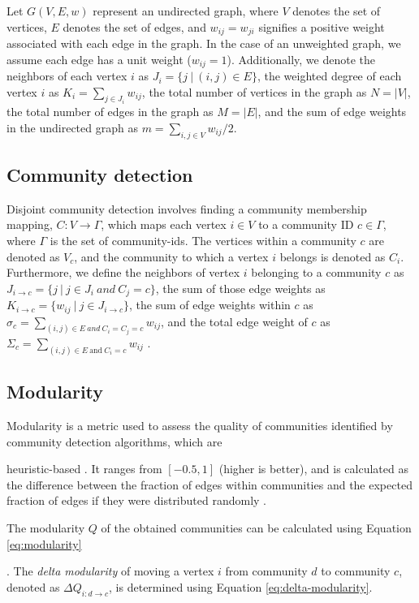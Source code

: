 Let $G(V, E, w)$ represent an undirected graph, where $V$ denotes the set of vertices, $E$ denotes the set of edges, and $w_{ij} = w_{ji}$ signifies a positive weight associated with each edge in the graph. In the case of an unweighted graph, we assume each edge has a unit weight ($w_{ij} = 1$). Additionally, we denote the neighbors of each vertex $i$ as $J_i = \{j\ |\ (i, j) \in E\}$, the weighted degree of each vertex $i$ as $K_i = \sum_{j \in J_i} w_{ij}$, the total number of vertices in the graph as $N = |V|$, the total number of edges in the graph as $M = |E|$, and the sum of edge weights in the undirected graph as $m = \sum_{i, j \in V} w_{ij}/2$.




\subsection{Community detection}

Disjoint community detection involves finding a community membership mapping, $C: V \rightarrow \Gamma$, which maps each vertex $i \in V$ to a community ID $c \in \Gamma$, where $\Gamma$ is the set of community-ids. The vertices within a community $c$ are denoted as $V_c$, and the community to which a vertex $i$ belongs is denoted as $C_i$. Furthermore, we define the neighbors of vertex $i$ belonging to a community $c$ as $J_{i \rightarrow c} = \{j\ |\ j \in J_i\ and\ C_j = c\}$, the sum of those edge weights as $K_{i \rightarrow c} = \{w_{ij}\ |\ j \in J_{i \rightarrow c}\}$, the sum of edge weights within $c$ as $\sigma_c = \sum_{(i, j) \in E\ and\ C_i = C_j = c} w_{ij}$, and the total edge weight of $c$ as $\Sigma_c = \sum_{(i, j) \in E\ \mbox{and}\ C_i = c} w_{ij}$ \cite{com-zarayeneh21}.




\subsection{Modularity}

Modularity is a metric used to assess the quality of communities identified by community detection algorithms, which are heuristic-based \cite{com-newman04}. It ranges from $[-0.5, 1]$ (higher is better), and is calculated as the difference between the fraction of edges within communities and the expected fraction of edges if they were distributed randomly \cite{com-brandes07}. The modularity $Q$ of the obtained communities can be calculated using Equation \ref{eq:modularity}. The \textit{delta modularity} of moving a vertex $i$ from community $d$ to community $c$, denoted as $\Delta Q_{i: d \rightarrow c}$, is determined using Equation \ref{eq:delta-modularity}.


